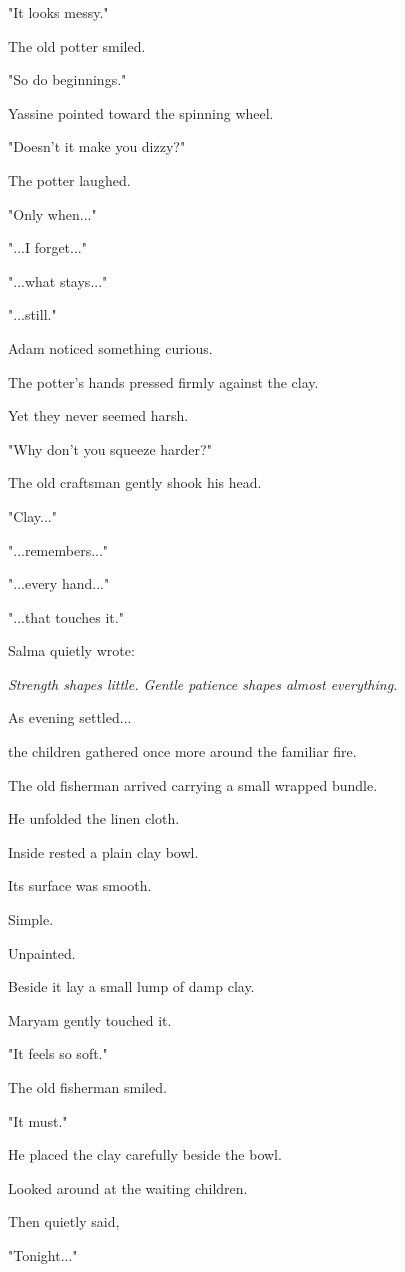 \documentclass[12pt,openany]{book}
\begin{document}
"It looks messy."

The old potter smiled.

"So do beginnings."

Yassine pointed toward the spinning wheel.

"Doesn't it make you dizzy?"

The potter laughed.

"Only when..."

"...I forget..."

"...what stays..."

"...still."

Adam noticed something curious.

The potter's hands pressed firmly against the clay.

Yet they never seemed harsh.

"Why don't you squeeze harder?"

The old craftsman gently shook his head.

"Clay..."

"...remembers..."

"...every hand..."

"...that touches it."

Salma quietly wrote:

\emph{Strength shapes little. Gentle patience shapes almost everything.}

As evening settled...

the children gathered once more around the familiar fire.

The old fisherman arrived carrying a small wrapped bundle.

He unfolded the linen cloth.

Inside rested a plain clay bowl.

Its surface was smooth.

Simple.

Unpainted.

Beside it lay a small lump of damp clay.

Maryam gently touched it.

"It feels so soft."

The old fisherman smiled.

"It must."

He placed the clay carefully beside the bowl.

Looked around at the waiting children.

Then quietly said,

"Tonight..."
\end{document}
